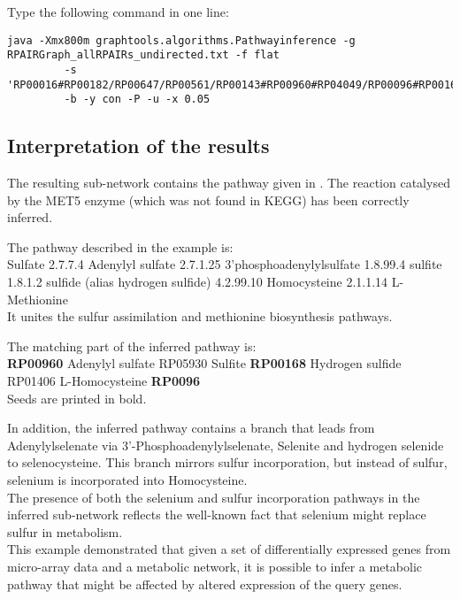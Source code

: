 Type the following command in one line:
{\color{Blue} \begin{footnotesize}
		\begin{verbatim}
java -Xmx800m graphtools.algorithms.Pathwayinference -g RPAIRGraph_allRPAIRs_undirected.txt -f flat
	     -s 'RP00016#RP00182/RP00647/RP00561/RP00143#RP00960#RP04049/RP00096#RP00168#RP04532/RP00003/RP00446/RP00946#RP00857/RP04474/RP00050#RP04533'
	     -b -y con -P -u -x 0.05
	\end{verbatim} \end{footnotesize}
	}

\subsection{Interpretation of the results}

The resulting sub-network contains the pathway given in \cite{vanHelden01}. The reaction catalysed by
the MET5 enzyme (which was not found in KEGG) has been correctly inferred.

The pathway described in the example is:\\
Sulfate 2.7.7.4 Adenylyl sulfate 2.7.1.25 3'phosphoadenylylsulfate 1.8.99.4 sulfite 1.8.1.2 sulfide (alias hydrogen sulfide) 4.2.99.10 Homocysteine 2.1.1.14 L-Methionine\\

It unites the sulfur assimilation and methionine biosynthesis pathways.

The matching part of the inferred pathway is:\\
\textbf{RP00960} Adenylyl sulfate RP05930 Sulfite \textbf{RP00168} Hydrogen sulfide RP01406 L-Homocysteine \textbf{RP0096}\\
Seeds are printed in bold.

In addition, the inferred pathway contains a branch that leads
from Adenylylselenate via 3'-Phosphoadenylylselenate, Selenite and hydrogen selenide to selenocysteine.
This branch mirrors sulfur incorporation, but instead of sulfur, selenium is incorporated into Homocysteine.\\

The presence of both the selenium and sulfur incorporation pathways in the inferred sub-network
reflects the well-known fact that selenium might replace sulfur in metabolism.\\

This example demonstrated that given a set of differentially expressed genes from
micro-array data and a metabolic network, it is possible to infer a metabolic pathway
that might be affected by altered expression of the query genes.

